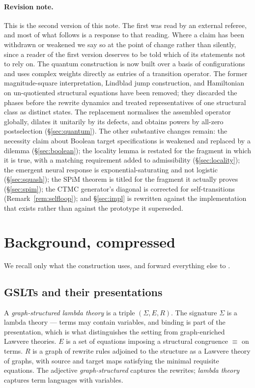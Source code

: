 \documentclass[11pt,a4paper]{article}
\theoremstyle{plain}
\theoremstyle{definition}
\theoremstyle{remark}
\begin{document}
\paragraph{Revision note.} This is the second version of this note. The first was read by an external
referee, and most of what follows is a response to that reading. Where a claim has been withdrawn or
weakened we say so at the point of change rather than silently, since a reader of the first version
deserves to be told which of its statements not to rely on. The quantum construction is now built
over a basis of configurations and uses complex weights directly as entries of a transition
operator. The former magnitude-square interpretation, Lindblad jump construction, and Hamiltonian on
un-quotiented structural equations have been removed; they discarded the phases before the rewrite
dynamics and treated representatives of one structural class as distinct states. The replacement
normalises the assembled operator globally, dilates it unitarily by its defects, and obtains powers by
all-zero postselection (\S\ref{sec:quantum}). The other substantive changes remain: the necessity
claim about Boolean target specifications is weakened and replaced by a dilemma
(\S\ref{sec:boolean}); the locality lemma is restated for the fragment in which it is true, with a
matching requirement added to admissibility (\S\ref{sec:locality}); the emergent neural response is
exponential-saturating and not logistic (\S\ref{sec:squash}); the SPiM theorem is titled for the
fragment it actually proves (\S\ref{sec:spim}); the CTMC generator's diagonal is corrected for
self-transitions (Remark~\ref{rem:selfloop}); and \S\ref{sec:impl} is rewritten against the
implementation that exists rather than against the prototype it superseded.

\section{Background, compressed}
\label{sec:background}

We recall only what the construction uses, and forward everything else to \cite{omnibus}.

\subsection{GSLTs and their presentations}

A \emph{graph-structured lambda theory} is a triple $(\Sigma, E, R)$. The signature $\Sigma$ is a
lambda theory --- terms may contain variables, and binding is part of the presentation, which is
what distinguishes the setting from graph-enriched Lawvere theories. $E$ is a set of equations
imposing a structural congruence $\equiv$ on terms. $R$ is a graph of rewrite rules adjoined to the
structure as a Lawvere theory of graphs, with source and target maps satisfying the minimal
requisite equations. The adjective \emph{graph-structured} captures the rewrites; \emph{lambda
theory} captures term languages with variables.
\end{document}
